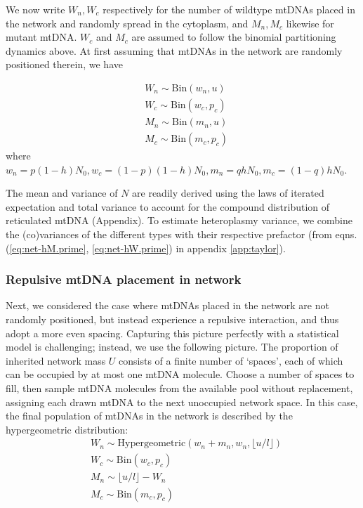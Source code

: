 \documentclass{article}
\newcommand{\be}{\begin{equation}}
\newcommand{\ee}{\end{equation}}
\begin{document}
We now write $W_n, W_c$ respectively for the number of wildtype mtDNAs placed in the network and randomly spread in the cytoplasm, and $M_n, M_c$ likewise for mutant mtDNA. $W_c$ and $M_c$ are assumed to follow the binomial partitioning dynamics above. At first assuming that mtDNAs in the network are randomly positioned therein, we have

\be\label{eq:model-no-repel}
    \begin{split}
        & W_n \sim \mathrm{Bin}\left(w_n,u\right) \\
        & W_c \sim \mathrm{Bin}\left(w_c,p_c\right) \\
        & M_n \sim \mathrm{Bin}\left(m_n,u\right) \\
        & M_c \sim \mathrm{Bin}\left(m_c,p_c\right)
    \end{split}
\ee
where $w_n = p(1-h)N_0, w_c = (1-p)(1-h)N_0, m_n = qhN_0, m_c = (1-q)hN_0$.

The mean and variance of $N$ are readily derived using the laws of iterated expectation and total variance to account for the compound distribution of reticulated mtDNA (Appendix). To estimate heteroplasmy variance, we combine the (co)variances of the different types with their respective prefactor (from eqns. (\ref{eq:net-hM.prime}, \ref{eq:net-hW.prime}) in appendix \ref{app:taylor}).

\subsubsection*{Repulsive mtDNA placement in network}
Next, we considered the case where mtDNAs placed in the network are not randomly positioned, but instead experience a repulsive interaction, and thus adopt a more even spacing. Capturing this picture perfectly with a statistical model is challenging; instead, we use the following picture. The proportion of inherited network mass $U$ consists of a finite number of `spaces', each of which can be occupied by at most one mtDNA molecule. Choose a number of spaces to fill, then sample mtDNA molecules from the available pool without replacement, assigning each drawn mtDNA to the next unoccupied network space. In this case, the final population of mtDNAs in the network is described by the hypergeometric distribution:
\be\label{eq:model-repel}
    \begin{split}
        & W_n \sim \mathrm{Hypergeometric}(w_n+m_n,w_n,\lfloor u/l \rfloor) \\
        & W_c \sim \mathrm{Bin}\left(w_c,p_c\right) \\
        & M_n \sim \lfloor u/l \rfloor-W_n \\
        & M_c \sim \mathrm{Bin}\left(m_c,p_c\right)
    \end{split}
\ee
\end{document}
